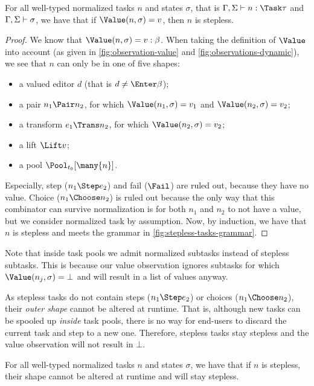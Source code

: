 \begin{proposition}
  \label{prp:valued-means-stepless}
  For all well-typed normalized tasks $n$ and states $\sigma$,
  that is $\Gamma,\Sigma \infers n:\Task\tau$ and $\Gamma,\Sigma \vdash \sigma$,
  we have that
    if $\Value(n,\sigma) = v$,
    then $n$ is stepless.
\end{proposition}
\begin{proof}
  We know that $\Value(n,\sigma) = v : \beta$.
  When taking the definition of $\Value$ into account (as given in \cref{fig:observation-value} and \cref{fig:observations-dynamic}),
  we see that $n$ can only be in one of five shapes:
  \begin{itemize}
    \item a valued editor $d$ (that is $d \neq \Enter\beta$);
    \item a pair $n_1 \Pair n_2$, for which $\Value(n_1,\sigma) = v_1$ and $\Value(n_2,\sigma) = v_2$;
    \item a transform $e_1 \Trans n_2$, for which $\Value(n_2,\sigma) = v_2$;
    \item a lift $\Lift v$;
    \item a pool $\Pool_{t_0} [\many{n}]$.
  \end{itemize}
  Especially, step ($n_1 \Step e_2$) and fail ($\Fail$) are ruled out, because they have no value.
  Choice ($n_1 \Choose n_2$) is ruled out
  because the only way that this combinator can survive normalization is for both $n_1$ and $n_2$ to not have a value,
  but we consider normalized task by assumption.
  Now, by induction, we have that $n$ is stepless and meets the grammar in \cref{fig:stepless-tasks-grammar}.
\end{proof}

Note that inside task pools we admit normalized subtasks instead of stepless subtasks.
This is because our value observation ignores subtasks for which $\Value(n_j,\sigma) = \bot$
and will result in a list of values anyway.

As stepless tasks do not contain steps ($n_1 \Step e_2$) or choices ($n_1 \Choose n_2$),
their \emph{outer shape} cannot be altered at runtime.
That is, although new tasks can be spooled up \emph{inside} task pools,
there is no way for end-users to discard the current task
and step to a new one.
Therefore, stepless tasks stay stepless and the value observation will not result in $\bot$.

\begin{corollary}
  \label{cor:stepless-stays-stepless}
  For all well-typed normalized tasks $n$ and states $\sigma$,
  we have that
    if $n$ is stepless,
    their shape cannot be altered at runtime
    and will stay stepless.
\end{corollary}

